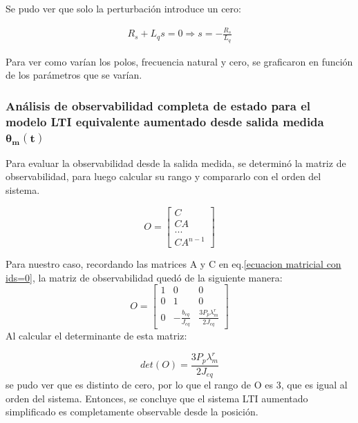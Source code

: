 \documentclass[a4paper, 10pt, onecolumn,journal]{ieeeconf}
\begin{document}
Se pudo ver que solo la perturbación introduce un cero:

\begin{align}
	 R_{s} + L_{q} s = 0 \Rightarrow s = -\frac{R_{s}}{L_{q}}
	 \label{cero del sistema LTI}
\end{align}

Para ver como varían los polos, frecuencia natural y  cero, se graficaron en función de los parámetros que se varían.


\subsubsection{\textbf{Análisis de observabilidad completa de estado para el modelo LTI equivalente aumentado desde salida medida $\mathbf{\theta_m(t)}$}}

Para evaluar la observabilidad desde la salida medida, se determinó la matriz de observabilidad, para luego calcular su rango y compararlo con el orden del sistema.

\begin{equation}
	O=
	\begin{bmatrix}
		C \\ 
		CA\\
		...\\
		CA^{n-1}  
	\end{bmatrix}
	\label{Matriz de observabilida generica}
\end{equation}

Para nuestro caso, recordando las matrices A y C en eq.\eqref{ecuacion matricial con ids=0}, la matriz de observabilidad quedó de la siguiente manera:
\begin{equation}
	O=
	\begin{bmatrix}
		1 & 0 & 0 \\ 
		0 & 1 & 0\\
		 0 & -\frac{b_{eq}}{J_{eq}} & \frac{3 P_p \lambda^r_m}{2 J_{eq}}  
	\end{bmatrix}
	\label{Matriz de observabilida del LTI}
\end{equation}
Al calcular el determinante de esta matriz:

\begin{equation}
	det(O)= \frac{3 P_p \lambda^r_m}{2 J_{eq}}
	\label{determinante de Matriz de observabilida del LTI}
\end{equation}
se pudo ver que es distinto de cero, por lo que el rango de O es 3, que es igual al orden del sistema. Entonces, se concluye que el sistema LTI aumentado simplificado es completamente observable desde la posición.
\end{document}

